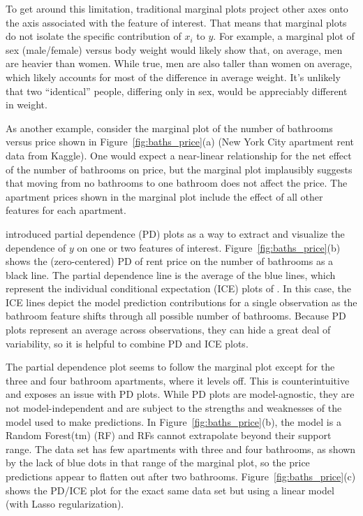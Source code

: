 \documentclass[12pt]{article}
\newcommand{\figref}[1]{Figure~\ref{#1}}
\begin{document}
To get around this limitation, traditional marginal plots project other axes onto the axis associated with the feature of interest.  That means that marginal plots do not isolate the specific contribution of $x_i$ to $y$. For example, a marginal plot of sex (male/female) versus body weight would likely show that, on average, men are heavier than women. While true, men are also taller than women on average, which likely accounts for most of the difference in average weight. It's unlikely that two ``identical'' people, differing only in sex, would be appreciably different in weight.  

As another example, consider the marginal plot of the number of bathrooms versus price shown in \figref{fig:baths_price}(a) (New York City apartment rent data from Kaggle). One would expect a near-linear relationship for the net effect of the number of bathrooms on price, but the marginal plot implausibly suggests that moving from no bathrooms to one bathroom does not affect the price.   The apartment prices shown in the marginal plot include the effect of all other features for each apartment.

\cite{PDP} introduced partial dependence (PD) plots as a way to extract and visualize the dependence of $y$ on one or two features of interest. \figref{fig:baths_price}(b) shows the (zero-centered) PD of rent price on the number of bathrooms as a black line. The partial dependence line is the average of the blue lines, which represent the individual conditional expectation (ICE) plots of \cite{ICE}.  In this case, the ICE lines depict the model prediction contributions for a single observation as the bathroom feature shifts through all possible number of bathrooms. Because PD plots represent an average across observations, they can hide a great deal of variability, so it is helpful to combine PD and ICE plots.

The partial dependence plot seems to follow the marginal plot except for the three and four bathroom apartments, where it levels off. This is counterintuitive and exposes an issue with PD plots. While PD plots are model-agnostic, they are not model-independent and are subject to the strengths and weaknesses of the model used to make predictions. In \figref{fig:baths_price}(b), the model is a Random Forest(tm) (RF) and RFs cannot extrapolate beyond their support range.  The data set has few apartments with three and four bathrooms, as shown by the lack of blue dots in that range of the marginal plot, so the price predictions appear to flatten out after two bathrooms.  \figref{fig:baths_price}(c) shows the PD/ICE plot for the exact same data set but using a linear model (with Lasso regularization).
 
\end{document}
